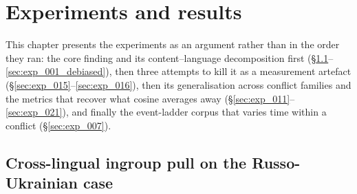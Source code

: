 \chapter{Experiments and results}\label{ch:experiments}

This chapter presents the experiments as an argument rather than in
the order they ran: the core finding and its content--language
decomposition first (\S\ref{sec:exp_001}--\ref{sec:exp_001_debiased}),
then three attempts to kill it as a measurement artefact
(\S\ref{sec:exp_015}--\ref{sec:exp_016}), then its generalisation
across conflict families and the metrics that recover what cosine
averages away (\S\ref{sec:exp_011}--\ref{sec:exp_021}), and finally
the event-ladder corpus that varies time within a conflict
(\S\ref{sec:exp_007}).

\section{Cross-lingual ingroup pull on the Russo-Ukrainian
  case}\label{sec:exp_001}\label{sec:exp_002}\label{sec:exp_014}

